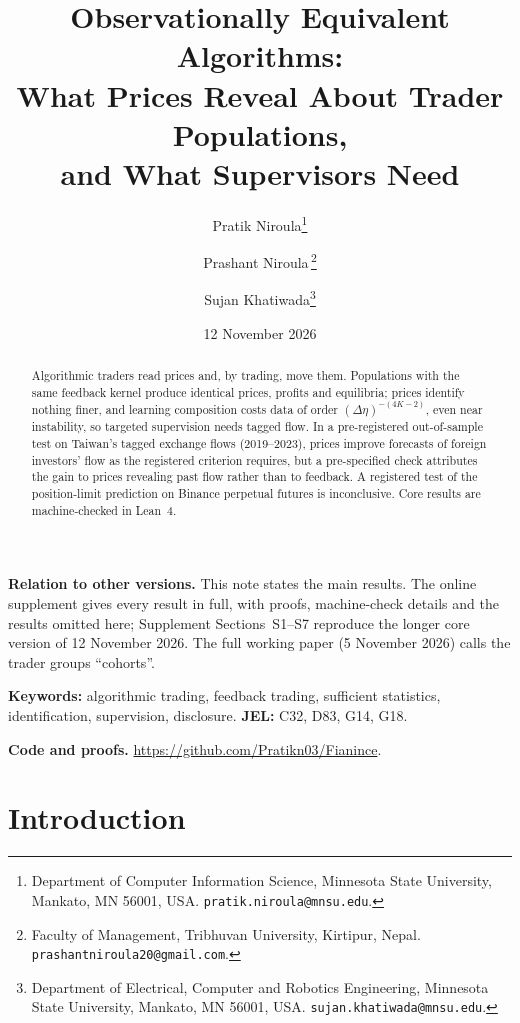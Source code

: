 \documentclass[12pt]{article}
\title{Observationally Equivalent Algorithms:\\ What Prices Reveal About Trader Populations,\\ and What Supervisors Need}
\author{Pratik Niroula\thanks{Department of Computer Information Science, Minnesota State University, Mankato, MN 56001, USA. \texttt{pratik.niroula@mnsu.edu}.}
\and Prashant Niroula\,\thanks{Faculty of Management, Tribhuvan University, Kirtipur, Nepal. \texttt{prashantniroula20@gmail.com}.}
\and Sujan Khatiwada\thanks{Department of Electrical, Computer and Robotics Engineering, Minnesota State University, Mankato, MN 56001, USA. \texttt{sujan.khatiwada@mnsu.edu}.}}
\date{12 November 2026}
\theoremstyle{definition}
\theoremstyle{remark}
\begin{document}
\maketitle
\thispagestyle{empty}\pagestyle{empty}
\begingroup\onehalfspacing

\begin{abstract}
\noindent Algorithmic traders read prices and, by trading, move them. Populations with the same feedback kernel produce identical prices, profits and equilibria; prices identify nothing finer, and learning composition costs data of order $(\Delta\eta)^{-(4K-2)}$, even near instability, so targeted supervision needs tagged flow. In a pre-registered out-of-sample test on Taiwan's tagged exchange flows (2019--2023), prices improve forecasts of foreign investors' flow as the registered criterion requires, but a pre-specified check attributes the gain to prices revealing past flow rather than to feedback. A registered test of the position-limit prediction on Binance perpetual futures is inconclusive. Core results are machine-checked in Lean~4.
\end{abstract}

\noindent\textbf{Relation to other versions.} This note states the main results. The online supplement gives every result in full, with proofs, machine-check details and the results omitted here; Supplement Sections~S1--S7 reproduce the longer core version of 12 November 2026. The full working paper (5 November 2026) calls the trader groups ``co\-horts''.

\noindent\textbf{Keywords:} algorithmic trading, feedback trading, sufficient statistics, identification, supervision, disclosure. \textbf{JEL:} C32, D83, G14, G18.

\noindent\textbf{Code and proofs.} \url{https://github.com/Pratikn03/Fianince}.

\endgroup
\newpage
\pagestyle{fancy}
\setcounter{page}{1}

\section{Introduction}\label{n:intro}
\end{document}
